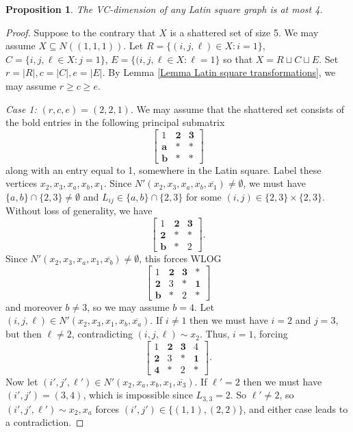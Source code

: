 \documentclass{article}
\newtheorem{prop}[thm]{Proposition}
\theoremstyle{definition}
\begin{document}
\begin{prop}
    The VC-dimension of any Latin square graph is at most 4.
\end{prop}
\begin{proof}
    Suppose to the contrary that $X$ is a shattered set of size 5. We may assume $X\subseteq N((1,1,1))$. Let $R=\{(i,j,\ell)\in X:i=1\}$, $C=\{i,j,\ell\in X:j=1\}$, $E=\{(i,j,\ell\in X:\ell=1\}$ so that $X=R\sqcup C\sqcup E$. Set $r=|R|,c=|C|,e=|E|$. By Lemma \ref{Lemma Latin square transformations}, we may assume $r\ge c\ge e$.

    \textit{Case 1:} $(r,c,e)=(2,2,1)$. We may assume that the shattered set consists of the bold entries in the following principal submatrix
    $$\begin{bmatrix}
        1&\textbf{2}&\textbf{3}\\
        \mathbf{a}&*&*\\
        \mathbf{b}&*&*
    \end{bmatrix}$$
    along with an entry equal to 1, somewhere in the Latin square. Label these vertices $x_2,x_3,x_a,x_b,x_1$. Since $N'(x_2,x_3,x_a,x_b,\overline{x_1})\ne\emptyset$, we must have $\{a,b\}\cap\{2,3\}\ne\emptyset$ and $L_{ij}\in\{a,b\}\cap\{2,3\}$ for some $(i,j)\in\{2,3\}\times\{2,3\}$. Without loss of generality, we have
    $$\begin{bmatrix}
        1&\textbf{2}&\textbf{3}\\
        \mathbf{2}&*&*\\
        \mathbf{b}&*&2
    \end{bmatrix}.$$
    Since $N'(x_2,x_3,x_a,x_1,\overline{x_b})\ne\emptyset$, this forces WLOG
        $$\begin{bmatrix}
        1&\textbf{2}&\textbf{3}&*\\
        \mathbf{2}&3&*&\mathbf{1}\\
        \mathbf{b}&*&2&*
    \end{bmatrix}$$
    and moreover $b\ne 3$, so we may assume $b=4$. Let $(i,j,\ell)\in N'(x_2,x_3,x_1,x_b,\overline{x_a})$. If $i\ne 1$ then we must have $i=2$ and $j=3$, but then $\ell\ne 2$, contradicting $(i,j,\ell)\sim x_2$. Thus, $i=1$, forcing
      $$\begin{bmatrix}
        1&\textbf{2}&\textbf{3}&4\\
        \mathbf{2}&3&*&\mathbf{1}\\
        \mathbf{4}&*&2&*
    \end{bmatrix}.$$
    Now let $(i',j',\ell')\in N'(x_2,x_a,x_b,x_1,\overline{x_3})$. If $\ell'=2$ then we must have $(i',j')=(3,4)$, which is impossible since $L_{3,3}=2$. So $\ell'\ne 2$, so $(i',j',\ell')\sim x_2,x_a$ forces $(i',j')\in\{(1,1),(2,2)\}$, and either case leads to a contradiction.


\end{proof}
\end{document}
